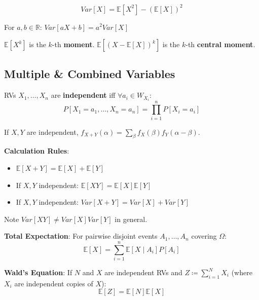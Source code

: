 \begin{theorem}
$$Var[X] = \mathbb{E}[X^2] - (\mathbb{E}[X])^2$$
\end{theorem}

\begin{lemma}
For $a, b \in \mathbb{R}$: $Var[aX+b] = a^2 Var[X]$
\end{lemma}

\begin{definition}
$\mathbb{E}[X^k]$ is the $k$-th \textbf{moment}. $\mathbb{E}[(X-\mathbb{E}[X])^k]$ is the $k$-th \textbf{central moment}.
\end{definition}

\subsection{Multiple \& Combined Variables}

\begin{definition}
RVs $X_1, \dots, X_n$ are \textbf{independent} iff $\forall a_i \in W_{X_i}$:
$$P[X_1=a_1, \dots, X_n=a_n] = \prod_{i=1}^n P[X_i=a_i]$$
\end{definition}

\begin{theorem}
If $X, Y$ are independent, $f_{X+Y}(\alpha) = \sum_{\beta} f_X(\beta) f_Y(\alpha-\beta)$.
\end{theorem}

\begin{remark}
\textbf{Calculation Rules}:
\begin{itemize}
    \item $\mathbb{E}[X+Y] = \mathbb{E}[X] + \mathbb{E}[Y]$
    \item If $X, Y$ independent: $\mathbb{E}[XY] = \mathbb{E}[X] \mathbb{E}[Y]$
    \item If $X, Y$ independent: $Var[X+Y] = Var[X] + Var[Y]$
\end{itemize}
Note $Var[XY] \neq Var[X]Var[Y]$ in general.
\end{remark}

\begin{theorem}
\textbf{Total Expectation}: For pairwise disjoint events $A_1, \dots, A_n$ covering $\Omega$:
$$\mathbb{E}[X] = \sum_{i=1}^n \mathbb{E}[X \mid A_i] P[A_i]$$
\end{theorem}

\begin{theorem}
\textbf{Wald's Equation}: If $N$ and $X$ are independent RVs and $Z \coloneqq \sum_{i=1}^N X_i$ (where $X_i$ are independent copies of $X$):
$$\mathbb{E}[Z] = \mathbb{E}[N] \mathbb{E}[X]$$
\end{theorem}
